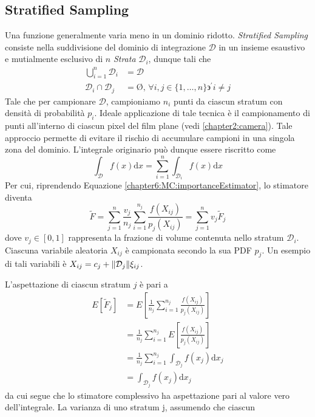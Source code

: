 \subsection{Stratified Sampling}
Una funzione generalmente varia meno in un dominio ridotto. \textit{Stratified Sampling} consiste nella suddivisione del dominio di integrazione 
$\mathcal{D}$ in un insieme esaustivo e mutialmente esclusivo di $n$ \textit{Strata} $\mathcal{D}_i$, dunque tali che
\begin{align*}
	\bigcup_{i=1}^n\mathcal{D}_i &= \mathcal{D} \\
	\mathcal{D}_i\cap\mathcal{D}_j &= \text{\O},\,\forall i,j\in\{1,\ldots,n\}\backepsilon^\prime i\neq j
\end{align*}
Tale che per campionare $\mathcal{D}$, campioniamo $n_i$ punti da ciascun stratum con densit\`a di probabilit\`a $p_i$. Ideale applicazione di tale 
tecnica \`e il campionamento di punti all'interno di ciascun pixel del film plane (vedi \ref{chapter2:camera}). Tale approccio permette di evitare 
il rischio di accumulare campioni in una singola zona del dominio. L'integrale originario pu\`o dunque essere riscritto come
\begin{equation}
	\int_{\mathcal{D}}f(x)\mathrm{d}x=\sum_{i=1}^n\int_{\mathcal{D}_i}f(x)\mathrm{d}x
\end{equation}
Per cui, riprendendo Equazione \ref{chapter6:MC:importanceEstimator}, lo stimatore diventa
\begin{equation}
	\tilde{F}=\sum_{j=1}^n\frac{v_j}{n_j}\sum_{i=1}^{n_j}\frac{f(X_{ij})}{p_j(X_{ij})}=\sum_{j=1}^nv_j\tilde{F}_j
\end{equation}
dove $v_j\in[0,1]$ rappresenta la frazione di volume contenuta nello stratum $\mathcal{D}_i$. Ciascuna variabile aleatoria $X_{ij}$ \`e campionata 
secondo la sua PDF $p_j$. Un esempio di tali variabili \`e $X_{ij}=c_j+\norm{\mathcal{D}_j}\xi_{ij}$.\par
L'aspettazione di ciascun stratum $j$ \`e pari a
\begin{align}
	E\left[\tilde{F}_j\right]&=E\left[\frac{1}{n_j}\sum_{i=1}^{n_j}\frac{f(X_{ij})}{p_j(X_{ij})}\right] \nonumber \\
		&=\frac{1}{n_j}\sum_{i=1}^{n_j}E\left[\frac{f(X_{ij})}{p_j(X_{ij})}\right] \nonumber \\
		&=\frac{1}{n_j}\sum_{i=1}^{n_j}\int_{\mathcal{D}_j}f(x_j)\mathrm{d}x_j \nonumber \\
		&=\int_{\mathcal{D}_j}f(x_j)\mathrm{d}x_j
\end{align}
da cui segue che lo stimatore complessivo ha aspettazione pari al valore vero dell'integrale. La varianza di uno stratum j, assumendo che ciascun 

